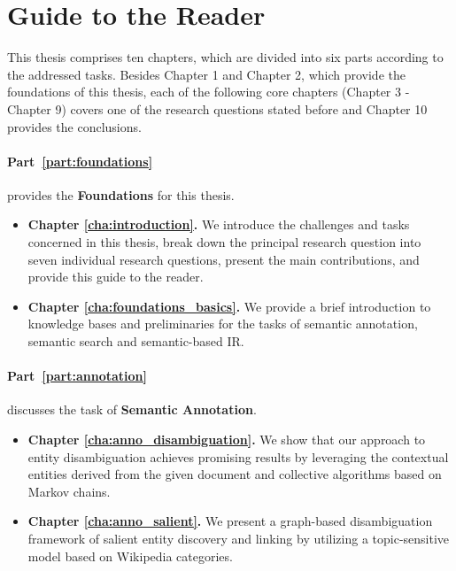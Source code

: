 \section{Guide to the Reader}

This thesis comprises ten chapters, which are divided into six parts according to the addressed tasks. Besides Chapter 1 and Chapter 2, which provide the foundations of this thesis, each of the following core chapters (Chapter 3 - Chapter 9) covers one of the research questions stated before and Chapter 10 provides the conclusions.


\paragraph{\textbf{Part~\ref{part:foundations}}} provides the \textbf{Foundations} for this thesis. 

\begin{itemize}
\item \textbf{Chapter \ref{cha:introduction}.} We introduce the challenges and tasks concerned in this thesis, break down the principal research question into seven individual research questions, present the main contributions, and provide this guide to the reader.
\item \textbf{Chapter \ref{cha:foundations_basics}.} We provide a brief introduction to knowledge bases and preliminaries for the tasks of semantic annotation, semantic search and semantic-based IR. 
\end{itemize}

\paragraph{\textbf{Part~\ref{part:annotation}}} discusses the task of \textbf{Semantic Annotation}.

\begin{itemize}
\item \textbf{Chapter \ref{cha:anno_disambiguation}.} We show that our approach to entity disambiguation achieves promising results 
by leveraging the contextual entities derived from the given document and collective algorithms based on Markov chains.
\item \textbf{Chapter \ref{cha:anno_salient}.} We present a graph-based disambiguation framework of salient entity discovery and linking by utilizing a topic-sensitive model based on Wikipedia categories.
\end{itemize}

